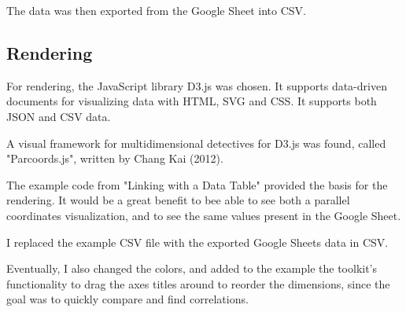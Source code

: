 The data was then exported from the Google Sheet into CSV.

\subsection{Rendering}

For rendering, the JavaScript library D3.js was chosen. It supports data-driven documents for visualizing data with HTML, SVG and CSS. It supports both JSON and CSV data.

A visual framework for multidimensional detectives for D3.js was found, called "Parcoords.js", written by Chang Kai (2012).

The example code from "Linking with a Data Table" provided the basis for the rendering. It would be a great benefit to bee able to see both a parallel coordinates visualization, and to see the same values present in the Google Sheet. %

I replaced the example CSV file with the exported Google Sheets data in CSV.

Eventually, I also changed the colors, and added to the example the toolkit's functionality to drag the axes titles around to reorder the dimensions, since the goal was to quickly compare and find correlations.

